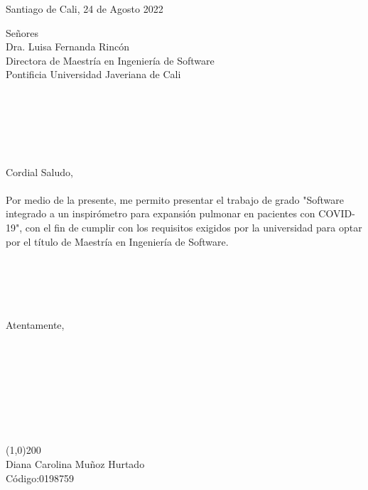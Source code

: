 \begin{flushright}
Santiago de Cali, 24 de Agosto 2022
\end{flushright}
Señores\\
Dra. Luisa Fernanda Rincón\\
Directora de Maestría en Ingeniería de Software\\
Pontificia Universidad Javeriana de Cali\\
\\
\\
\\
\\
\\
\\
Cordial Saludo,\\
\\
Por medio de la presente, me permito presentar el trabajo de grado "Software integrado a un inspirómetro para expansión pulmonar
en pacientes con COVID-19", con el fin de cumplir con los requisitos exigidos por la universidad para optar por el título de Maestría en Ingeniería de Software.\\
\\
\\
\\
\\
\\
Atentamente,\\\\\\
\\
\\
\\
\\
\\
\\
\line(1,0){200} \\
Diana Carolina Muñoz Hurtado \qquad \qquad \\
Código:0198759 \qquad \qquad \qquad \qquad 
\newpage